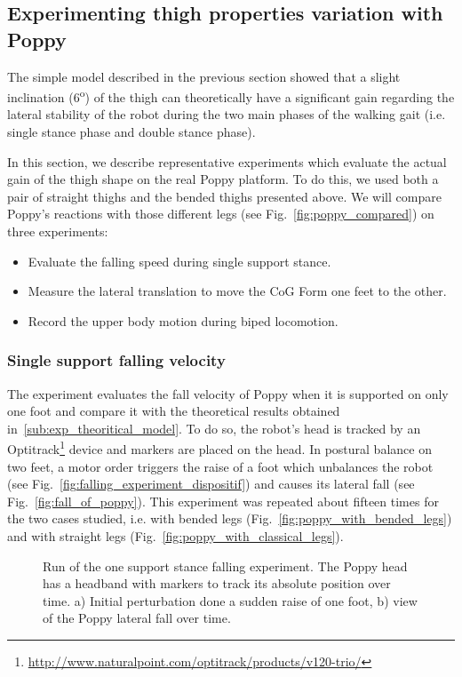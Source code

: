 \subsection{Experimenting thigh properties variation with Poppy} %

The simple model described in the previous section showed that a slight inclination (6\textsuperscript{o}) of the thigh can theoretically have a significant gain regarding the lateral stability of the robot during the two main phases of the walking gait (i.e. single stance phase and double stance phase).

In this section, we describe representative experiments which evaluate the actual gain of the thigh shape on the real Poppy platform. To do this, we used both a pair of straight thighs and the bended thighs presented above. We will compare Poppy's reactions with those different legs (see Fig.~\ref{fig:poppy_compared}) on three experiments:
\begin{itemize}
    \item Evaluate the falling speed during single support stance.
    \item Measure the lateral translation to move the CoG Form one feet to the other.
    \item Record the upper body motion during biped locomotion.
\end{itemize}

\subsubsection{Single support falling velocity} %
\label{ssub:falling_velocity}
The experiment evaluates the fall velocity of Poppy when it is supported on only one foot and compare it with the theoretical results obtained in~\ref{sub:exp_theoritical_model}. To do so, the robot's head is tracked by an Optitrack\footnote{\url{http://www.naturalpoint.com/optitrack/products/v120-trio/}} device and markers are placed on the head. In postural balance on two feet, a motor order triggers the raise of a foot which unbalances the robot (see Fig.~\ref{fig:falling_experiment_dispositif}) and causes its lateral fall (see Fig.~\ref{fig:fall_of_poppy}). This experiment was repeated about fifteen times for the two cases studied, i.e. with bended legs (Fig.~\ref{fig:poppy_with_bended_legs}) and with straight legs (Fig.~\ref{fig:poppy_with_classical_legs}).

\begin{figure}[h]
\centering
    \hfil
    \caption{Run of the one support stance falling experiment.
    The Poppy head has a headband with markers to track its absolute position over time.
     a) Initial perturbation done a sudden raise of one foot, b) view of the Poppy lateral fall over time.}
    \label{fig:falling_experiment}
\end{figure}

